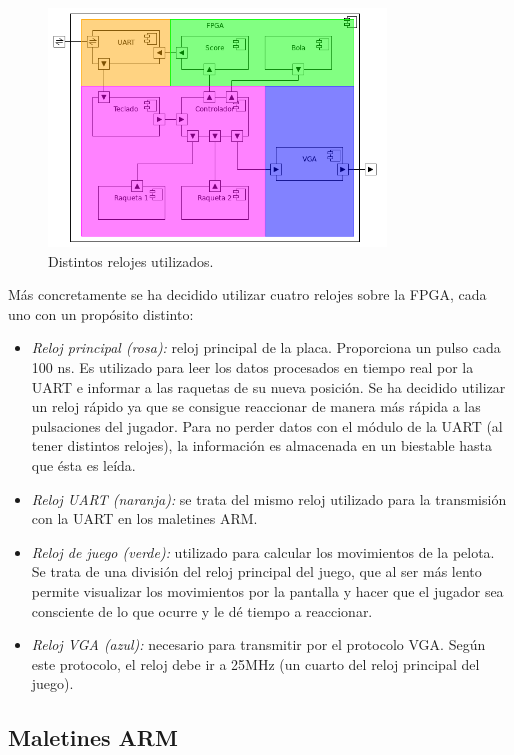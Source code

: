 \begin{figure}[h]
  \centering
  \includegraphics[width=0.8\textwidth]{images/fpga_componentes_timing_v2.png}
  \caption{Distintos relojes utilizados.}
  \label{s3:fig:componentes-fpga-clocking}
\end{figure}


Más concretamente se ha decidido utilizar cuatro relojes sobre la FPGA,
cada uno con un propósito distinto:
\begin{itemize}
\item \emph{Reloj principal (rosa):} reloj principal de la
  placa. Proporciona un pulso cada 100 ns. Es utilizado para leer los datos
  procesados en tiempo real por la UART e informar a las raquetas de su
  nueva posición. Se ha decidido utilizar un reloj rápido ya que se
  consigue reaccionar de manera más rápida a las pulsaciones del
  jugador. Para no perder datos con el módulo de la UART (al tener
  distintos relojes), la información es almacenada en un biestable hasta
  que ésta es leída.
\item \emph{Reloj UART (naranja):} se trata del mismo reloj utilizado para
  la transmisión con la UART en los maletines ARM.
\item \emph{Reloj de juego (verde):} utilizado para calcular los
  movimientos de la pelota. Se trata de una división del reloj principal
  del juego, que al ser más lento permite visualizar los movimientos por la
  pantalla y hacer que el jugador sea consciente de lo que ocurre y le dé
  tiempo a reaccionar.
\item \emph{Reloj VGA (azul):} necesario para transmitir por el
  protocolo VGA. Según este protocolo, el reloj debe ir a 25MHz (un cuarto
  del reloj principal del juego).
\end{itemize}

\subsection{Maletines ARM}
\label{s3:subsec:maletines}

